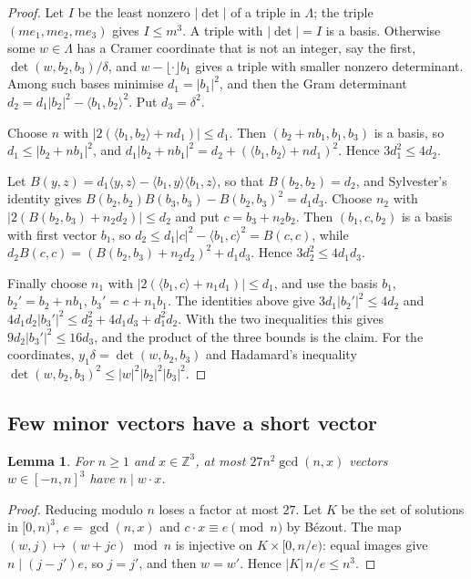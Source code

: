 \documentclass[11pt]{amsart}
\newtheorem{lemma}[theorem]{Lemma}
\theoremstyle{definition}
\theoremstyle{remark}
\begin{document}
\begin{proof}
Let $I$ be the least nonzero $|\det|$ of a triple in $\Lambda$; the triple
$(me_1,me_2,me_3)$ gives $I\le m^3$. A triple with $|\det|=I$ is a basis. Otherwise some
$w\in\Lambda$ has a Cramer coordinate that is not an integer, say the first,
$\det(w,b_2,b_3)/\delta$, and $w-\lfloor\cdot\rfloor b_1$ gives a triple with smaller nonzero
determinant. Among such bases
minimise $d_1=|b_1|^2$, and then the Gram determinant $d_2=d_1|b_2|^2-\langle b_1,b_2\rangle^2$.
Put $d_3=\delta^2$.

Choose $n$ with $|2(\langle b_1,b_2\rangle+nd_1)|\le d_1$. Then $(b_2+nb_1,b_1,b_3)$ is a basis, so
$d_1\le|b_2+nb_1|^2$, and $d_1|b_2+nb_1|^2=d_2+(\langle b_1,b_2\rangle+nd_1)^2$. Hence
$3d_1^2\le4d_2$.

Let $B(y,z)=d_1\langle y,z\rangle-\langle b_1,y\rangle\langle b_1,z\rangle$, so that
$B(b_2,b_2)=d_2$, and Sylvester's identity gives $B(b_2,b_2)B(b_3,b_3)-B(b_2,b_3)^2=d_1d_3$. Choose
$n_2$ with $|2(B(b_2,b_3)+n_2d_2)|\le d_2$ and put $c=b_3+n_2b_2$. Then $(b_1,c,b_2)$ is a basis
with first vector $b_1$, so $d_2\le d_1|c|^2-\langle b_1,c\rangle^2=B(c,c)$, while
$d_2B(c,c)=(B(b_2,b_3)+n_2d_2)^2+d_1d_3$. Hence $3d_2^2\le4d_1d_3$.

Finally choose $n_1$ with $|2(\langle b_1,c\rangle+n_1d_1)|\le d_1$, and use the basis
$b_1$, $b_2'=b_2+nb_1$, $b_3'=c+n_1b_1$. The identities above give
$3d_1|b_2'|^2\le4d_2$ and $4d_1d_2|b_3'|^2\le d_2^2+4d_1d_3+d_1^2d_2$. With the two inequalities
this gives $9d_2|b_3'|^2\le16d_3$, and the product of the three bounds is the claim. For the
coordinates, $y_1\delta=\det(w,b_2,b_3)$ and Hadamard's inequality $\det(w,b_2,b_3)^2\le
|w|^2|b_2|^2|b_3|^2$.
\end{proof}

\subsection{Few minor vectors have a short vector}

\begin{lemma}\label{lem:dotcount}
For $n\ge1$ and $x\in\mathbb Z^3$, at most $27n^2\gcd(n,x)$ vectors $w\in[-n,n]^3$ have
$n\mid w\cdot x$.
\end{lemma}

\begin{proof}
Reducing modulo $n$ loses a factor at most $27$. Let $K$ be the set of solutions in
$[0,n)^3$, $e=\gcd(n,x)$ and $c\cdot x\equiv e\pmod n$ by B\'ezout. The map
$(w,j)\mapsto(w+jc)\bmod n$ is injective on $K\times[0,n/e)$: equal images give
$n\mid(j-j')e$, so $j=j'$, and then $w=w'$. Hence $|K|\,n/e\le n^3$.
\end{proof}
\end{document}
